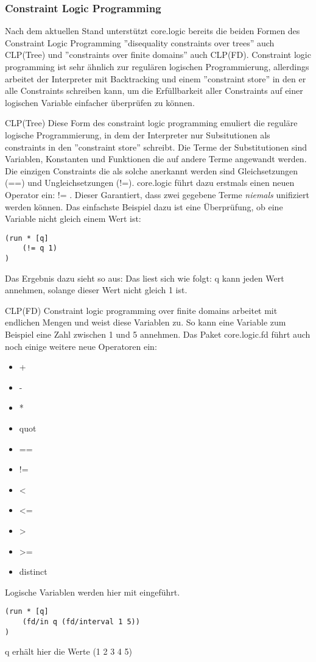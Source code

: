 \subsubsection{Constraint Logic Programming}
Nach dem aktuellen Stand unterstützt core.logic bereits die beiden Formen des Constraint Logic Programming ''disequality constraints over trees'' auch CLP(Tree) und ''constraints over finite domains'' auch CLP(FD).
Constraint logic programming ist sehr ähnlich zur regulären logischen Programmierung, allerdings arbeitet der Interpreter mit Backtracking und einem ''constraint store'' in den er alle Constraints schreiben kann, um die Erfüllbarkeit aller Constraints auf einer logischen Variable einfacher überprüfen zu können.

\begin{description}
\item{CLP(Tree)}
Diese Form des constraint logic programming emuliert die reguläre logische Programmierung, in dem der Interpreter nur Subsitutionen als constraints in den ''constraint store'' schreibt. Die Terme der Substitutionen sind Variablen, Konstanten und Funktionen die auf andere Terme angewandt werden. Die einzigen Constraints die als solche anerkannt werden sind Gleichsetzungen (==) und Ungleichsetzungen (!=).
core.logic führt dazu erstmals einen neuen Operator ein: != . Dieser Garantiert, dass zwei gegebene Terme \emph{niemals} unifiziert werden können.
Das einfachste Beispiel dazu ist eine Überprüfung, ob eine Variable nicht gleich einem Wert ist:
\begin{lstlisting}
(run * [q]
	(!= q 1)
)
\end{lstlisting}
Das Ergebnis dazu sieht so aus:  Das liest sich wie folgt: q kann jeden Wert annehmen, solange dieser Wert nicht gleich 1 ist.

\item{CLP(FD)}
Constraint logic programming over finite domains arbeitet mit endlichen Mengen und weist diese Variablen zu. So kann eine Variable zum Beispiel eine Zahl zwischen 1 und 5 annehmen. Das Paket core.logic.fd führt auch noch einige weitere neue Operatoren ein:
\begin{itemize}
\item{+}
\item{-}
\item{*}
\item{quot}
\item{==}
\item{!=}
\item{<}
\item{<=}
\item{>}
\item{>=}
\item{distinct}
\end{itemize}
Logische Variablen werden hier mit  eingeführt.
\begin{lstlisting}
(run * [q]
	(fd/in q (fd/interval 1 5))
)
\end{lstlisting}
q erhält hier die Werte (1 2 3 4 5)\\


\end{description}
